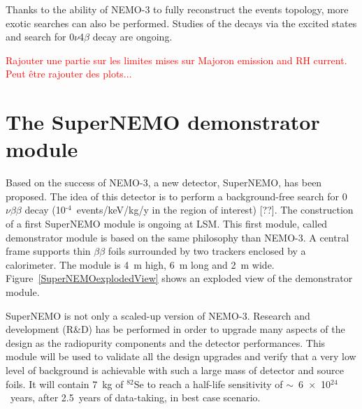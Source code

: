 \documentclass[main.tex]{subfiles}
\begin{document}
\NI Thanks to the ability of NEMO-3 to fully reconstruct the events topology, more exotic searches can also be performed. Studies of the decays via the excited states and search for 0$\nu$4$\beta$ decay are ongoing.

\bigskip


\NI \textcolor{red}{Rajouter une partie sur les limites mises sur Majoron emission and RH current. Peut être rajouter des plots...}


\FloatBarrier

\newpage


\section{The SuperNEMO demonstrator module}\label{sec:SuperNEMO}


\NI Based on the success of NEMO-3, a new detector, SuperNEMO, has been proposed. The idea of this detector is to perform a background-free search for 0$\nu\beta\beta$ decay (10$^{\text{-4}}$~events/keV/kg/y in the region of interest) [??]. The construction of a first SuperNEMO module is ongoing at LSM. This first module, called demonstrator module is based on the same philosophy than NEMO-3. A central frame supports thin $\beta\beta$ foils surrounded by two trackers enclosed by a calorimeter. The module is 4~m high, 6~m long and 2~m wide. Figure~\ref{SuperNEMOexplodedView} shows an exploded view of the demonstrator module.


\bigskip


\NI SuperNEMO is not only a scaled-up version of NEMO-3. Research and development (R\&D) has be performed in order to upgrade many aspects of the design as the radiopurity components and the detector performances. This module will be used to validate all the design upgrades and verify that a very low level of background is achievable with such a large mass of detector and source foils. It will contain 7~kg of $^{\text{82}}$Se to reach a half-life sensitivity of $\sim$~6~$\times$~10$^{\text{24}}$~years, after 2.5~years of data-taking, in best case scenario.
\end{document}
